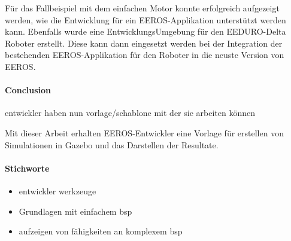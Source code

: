 Für das Fallbeispiel mit dem einfachen Motor konnte erfolgreich aufgezeigt werden, wie die Entwicklung für ein EEROS-Applikation unterstützt werden kann.
Ebenfalls wurde eine Entwicklungs\-Umgebung für den EEDURO-Delta Roboter erstellt.
Diese kann dann eingesetzt werden bei der Integration der bestehenden EEROS-Applikation für den Roboter in die neuste Version von EEROS.

\paragraph*{Conclusion}
entwickler haben nun vorlage/schablone mit der sie arbeiten können

Mit dieser Arbeit erhalten EEROS-Entwickler eine Vorlage für erstellen von Simulationen in Gazebo und das Darstellen der Resultate.

\paragraph*{Stichworte}
\begin{itemize}
\item entwickler werkzeuge
\item Grundlagen mit einfachem bsp
\item aufzeigen von fähigkeiten an komplexem bsp
\end{itemize}